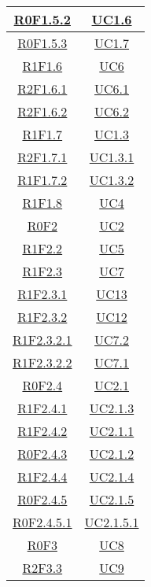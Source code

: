 \begin{longtable}{|c|c|}
\hline
\hyperlink{R0F1.5.2}{R0F1.5.2} & \hyperlink{UC1.6}{UC1.6}\\
\hline
\hyperlink{R0F1.5.3}{R0F1.5.3} & \hyperlink{UC1.7}{UC1.7}\\
\hline
\hyperlink{R1F1.6}{R1F1.6} & \hyperlink{UC6}{UC6}\\
\hline
\hyperlink{R2F1.6.1}{R2F1.6.1} & \hyperlink{UC6.1}{UC6.1}\\
\hline
\hyperlink{R2F1.6.2}{R2F1.6.2} & \hyperlink{UC6.2}{UC6.2}\\
\hline
\hyperlink{R1F1.7}{R1F1.7} & \hyperlink{UC1.3}{UC1.3}\\
\hline
\hyperlink{R2F1.7.1}{R2F1.7.1} & \hyperlink{UC1.3.1}{UC1.3.1}\\
\hline
\hyperlink{R1F1.7.2}{R1F1.7.2} & \hyperlink{UC1.3.2}{UC1.3.2}\\
\hline
\hyperlink{R1F1.8}{R1F1.8} & \hyperlink{UC4}{UC4}\\
\hline
\hyperlink{R0F2}{R0F2} & \hyperlink{UC2}{UC2}\\
\hline
\hyperlink{R1F2.2}{R1F2.2} & \hyperlink{UC5}{UC5}\\
\hline
\hyperlink{R1F2.3}{R1F2.3} & \hyperlink{UC7}{UC7}\\
\hline
\hyperlink{R1F2.3.1}{R1F2.3.1} & \hyperlink{UC13}{UC13}\\
\hline
\hyperlink{R1F2.3.2}{R1F2.3.2} & \hyperlink{UC12}{UC12}\\
\hline
\hyperlink{R1F2.3.2.1}{R1F2.3.2.1} & \hyperlink{UC7.2}{UC7.2}\\
\hline
\hyperlink{R1F2.3.2.2}{R1F2.3.2.2} & \hyperlink{UC7.1}{UC7.1}\\
\hline
\hyperlink{R0F2.4}{R0F2.4} & \hyperlink{UC2.1}{UC2.1}\\
\hline
\hyperlink{R1F2.4.1}{R1F2.4.1} & \hyperlink{UC2.1.3}{UC2.1.3}\\
\hline
\hyperlink{R1F2.4.2}{R1F2.4.2} & \hyperlink{UC2.1.1}{UC2.1.1}\\
\hline
\hyperlink{R0F2.4.3}{R0F2.4.3} & \hyperlink{UC2.1.2}{UC2.1.2}\\
\hline
\hyperlink{R1F2.4.4}{R1F2.4.4} & \hyperlink{UC2.1.4}{UC2.1.4}\\
\hline
\hyperlink{R0F2.4.5}{R0F2.4.5} & \hyperlink{UC2.1.5}{UC2.1.5}\\
\hline
\hyperlink{R0F2.4.5.1}{R0F2.4.5.1} & \hyperlink{UC2.1.5.1}{UC2.1.5.1}\\
\hline
\hyperlink{R0F3}{R0F3} & \hyperlink{UC8}{UC8}\\
\hline
\hyperlink{R2F3.3}{R2F3.3} & \hyperlink{UC9}{UC9}\\

\end{longtable}
